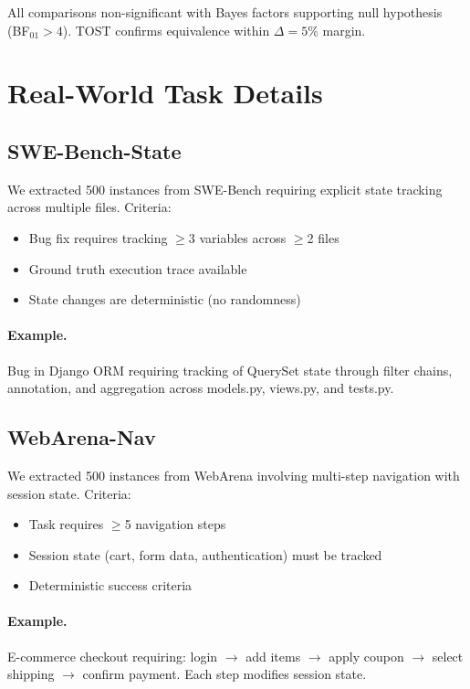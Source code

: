 \documentclass{article}
\theoremstyle{plain}
\theoremstyle{definition}
\theoremstyle{remark}
\begin{document}
All comparisons non-significant with Bayes factors supporting null hypothesis (BF$_{01} > 4$). TOST confirms equivalence within $\Delta = 5\%$ margin.


\section{Real-World Task Details}
\label{app:realworld}

\subsection{SWE-Bench-State}

We extracted 500 instances from SWE-Bench \citep{jimenez2024swebench} requiring explicit state tracking across multiple files. Criteria:
\begin{itemize}
\item Bug fix requires tracking $\geq$3 variables across $\geq$2 files
\item Ground truth execution trace available
\item State changes are deterministic (no randomness)
\end{itemize}

\paragraph{Example.} Bug in Django ORM requiring tracking of QuerySet state through filter chains, annotation, and aggregation across models.py, views.py, and tests.py.

\subsection{WebArena-Nav}

We extracted 500 instances from WebArena \citep{zhou2024webarena} involving multi-step navigation with session state. Criteria:
\begin{itemize}
\item Task requires $\geq$5 navigation steps
\item Session state (cart, form data, authentication) must be tracked
\item Deterministic success criteria
\end{itemize}

\paragraph{Example.} E-commerce checkout requiring: login $\rightarrow$ add items $\rightarrow$ apply coupon $\rightarrow$ select shipping $\rightarrow$ confirm payment. Each step modifies session state.
\end{document}
